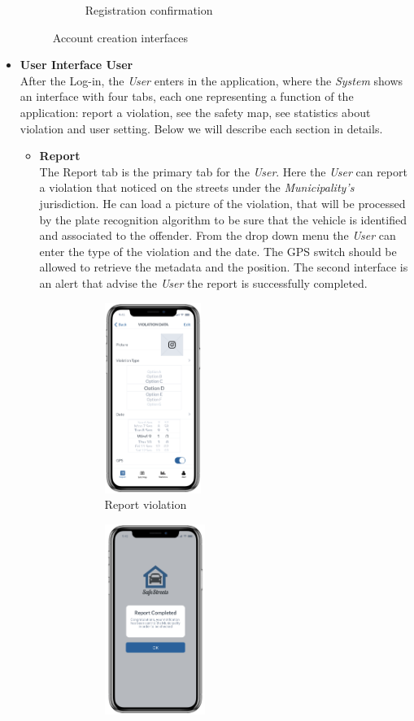 \documentclass {article}
\begin{document}
\begin{itemize}
\begin{figure} [H]
\begin{subfigure}{.4\textwidth}
				\caption{Registration confirmation}
			\end{subfigure}
			\caption{Account creation interfaces} 
			\end{figure}
		\item {\bf User Interface User} \\
		After the Log-in, the {\it User} enters in the application, where the {\it System} shows an interface with four tabs, each one representing a function of the application: report a violation, see the safety map, see statistics about violation and user setting. Below we will describe each section in details. 
			\begin{itemize}
			\item {\bf Report} \\
			The Report tab is the primary tab for the {\it User}. Here the {\it User} can report a violation that noticed on the streets under the {\it Municipality's} jurisdiction. He can load a picture of the violation, that will be processed by the plate recognition algorithm to be sure that the vehicle is identified and associated to the offender. From the drop down menu the {\it User} can enter the type of the violation and the date. The GPS switch should be allowed to retrieve the metadata and the position. The second interface is an alert that advise the {\it User} the report is successfully completed. 
			\begin{figure}[H]
				\centering
			\begin{subfigure}{.4\textwidth}
				\centering
				\includegraphics[height=6.2cm]{Images/Interfaces/user_report.png}
				\caption{Report violation}
			\end{subfigure}
			\begin{subfigure}{.4\textwidth}
				\centering
				\includegraphics[height=6.2cm]{Images/Interfaces/user_report_done.png}

\end{subfigure}
\end{figure}
\end{itemize}
\end{itemize}
\end{document}

